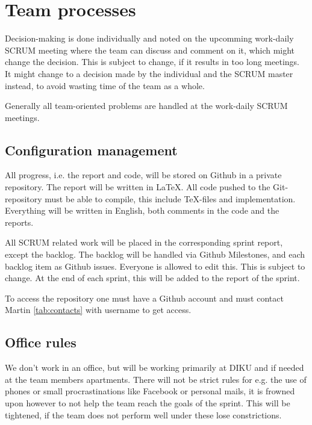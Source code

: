 \section{Team processes}

Decision-making is done individually and noted on the upcomming work-daily SCRUM meeting where the team can discuss and comment on it, which might change the decision. This is subject to change, if it results in too long meetings. It might change to a decision made by the individual and the SCRUM master instead, to avoid wasting time of the team as a whole.

Generally all team-oriented problems are handled at the work-daily SCRUM meetings.

\subsection{Configuration management}
All progress, i.e. the report and code, will be stored on Github in a private repository.
The report will be written in \LaTeX.
All code pushed to the Git-repository must be able to compile, this include \TeX-files and implementation.
Everything will be written in English, both comments in the code and the reports.

All SCRUM related work will be placed in the corresponding sprint report, except the backlog. The backlog will be handled via Github Milestones, and each backlog item as Github issues. Everyone is allowed to edit this. This is subject to change. At the end of each sprint, this will be added to the report of the sprint.

To access the repository one must have a Github account and must contact Martin \ref{tab:contacts} with username to get access.


\subsection{Office rules}
We don't work in an office, but will be working primarily at DIKU and if needed at the team members apartments. There will not be strict rules for e.g. the use of phones or small procrastinations like Facebook or personal mails, it is frowned upon however to not help the team reach the goals of the sprint. This will be tightened, if the team does not perform well under these lose constrictions.


